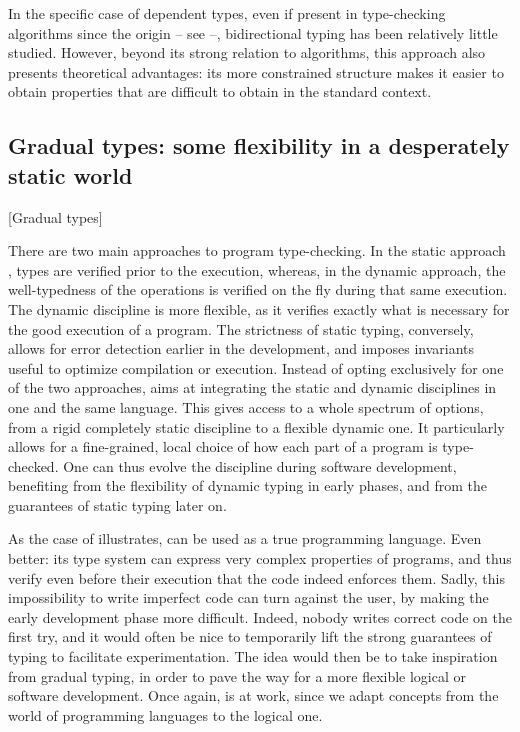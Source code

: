 In the specific case of dependent types, even if present in type-checking algorithms since
the origin – see \eg {} –, bidirectional typing has been relatively little
studied. However, beyond its strong relation to algorithms, this approach also presents
theoretical advantages: its more constrained structure makes it easier
to obtain properties that are difficult to obtain in the standard context.

\subsection{Gradual types: some flexibility in a desperately static world}
  [Gradual types]
\label{sec:intro-graduel-en}

There are two main approaches to program type-checking. In the static approach%
,
types are verified prior to the execution, whereas, in the dynamic approach, the well-typedness
of the operations is verified on the fly during that same execution.
The dynamic discipline is more flexible, as it verifies exactly what is necessary
for the good execution of a program.
The strictness of static typing, conversely, allows for error detection earlier in the
development, and imposes invariants useful to optimize compilation or execution.
Instead of opting exclusively for one of the two approaches,
  aims at integrating
the static and dynamic disciplines in one and the
same language. This gives access to a whole spectrum of options, from a rigid completely static
discipline to a flexible dynamic one. It particularly allows for a fine-grained, local choice
of how each part of a program is type-checked.
One can thus evolve the discipline during software development, benefiting from
the flexibility of dynamic typing in early phases, and from the guarantees of static typing
later on.

As the case of  illustrates,  can be used as a true programming language.
Even better: its type system can express very complex properties of programs, and thus
verify even before their execution that the code indeed enforces them.
Sadly, this impossibility to write imperfect code can turn against the user, by making the
early development phase more difficult. Indeed, nobody writes correct code on the first try,
and it would often be nice to temporarily lift the strong guarantees of typing to
facilitate experimentation. The idea would then be to take inspiration from gradual typing,
in order to pave the way for a more flexible logical or software development. Once again,
 is at work, since we adapt concepts from the world of
programming languages to the logical one.

